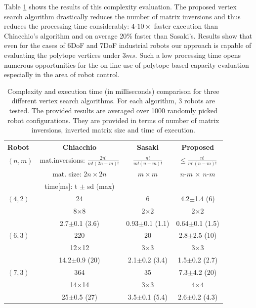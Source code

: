 Table \ref{tab:complexity_results} shows the results of this complexity evaluation. The proposed vertex search algorithm drastically reduces the number of matrix inversions and thus reduces the processing time considerably: $4$-$10\times$ faster execution than Chiacchio's algorithm and on average 20\% faster than Sasaki's. Results show that even for the cases of 6DoF and 7DoF industrial robots our approach is capable of evaluating the polytope vertices under $3ms$. Such a low processing time opens numerous opportunities for the on-line use of polytope based capacity evaluation especially in the area of robot control.

\begin{table}
    \centering
    \caption{Complexity and execution time (in milliseconds) comparison for three different vertex search algorithms. For each algorithm, 3 robots are tested. The provided results are averaged over 1000 randomly picked robot configurations. They are provided in terms of number of matrix inversions, inverted matrix size and time of execution.}
    \begin{tabular}{|l|c|c|c|}
       \hline
       Robot & \textbf{Chiacchio}\cite{chiacchio_evaluation_1996} & \textbf{Sasaki} \cite{sasaki_vertex_nodate}  &  \textbf{Proposed} \\
       \hline
       $(n,m)$& mat.inversions: $ \frac{2n!}{m!(2n-m)!}$  & $ \frac{n!}{m!(n-m)!} $ & $ \leq \frac{n!}{m!(n-m)!}$ \\
       &  mat. size:  $ 2n \times 2n$ & $m\times m$  & $n$-$m$ $\times$ $n$-$m$\\
       & time[ms]: t $\pm$ sd (max) & & \\
       \hline
       $(4,2)$ &  24 & 6 & 4.2$\pm$1.4 (6) \\ 
       & 8$\times$8 & 2$\times$2 & 2$\times$2 \\ 
       & 2.7$\pm$0.1 (3.6) & 0.93$\pm$0.1 (1.1) & 0.64$\pm$0.1 (1.5) \\ 
       \hline
       $(6,3)$ & 220 & 20 & 2.8$\pm$2.5 (10) \\ 
        & 12$\times$12 & 3$\times$3 & 3$\times$3 \\ 
       & 14.2$\pm$0.9 (20) & 2.1$\pm$0.2 (3.4) & 1.5$\pm$0.2 (2.7) \\ 
       \hline
      $(7,3)$&    364 & 35 & 7.3$\pm$4.2 (20)\\
        & 14$\times$14 & 3$\times$3 & 4$\times4$\\
       & 25$\pm$0.5 (27) & 3.5$\pm$0.1 (5.4) & 2.6$\pm$0.2 (4.3)\\

       \hline
    \end{tabular}
    \label{tab:complexity_results}
\end{table}


